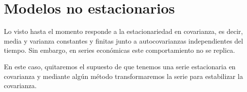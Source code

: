 \documentclass[a4paper,10pt]{article}
\begin{document}
\begin{comment}
      - **Media Móvil Exponencial:** Es un tipo particular de Media Móvil Ponderada que responde a un crecimiento o decrecimiento exponencial, donde los datos antiguos influyen, pero es casi insignificante.

<br>
<br>
<br>
Luego de esta introducción podemos definir matemáticamente a los modelos ARMA. El modelo general de series temporales autorregresivo con media móvil de _p_ términos autorregresivos y _q_ términos de media móvil se expresa como:
<p align="center">
  <img src=https://economipedia.com/wp-content/uploads/Modelo-ARMA.jpg />
</p>
\end{comment}


\section{Modelos no estacionarios}

Lo visto hasta el momento responde a la estacionariedad en covarianza, es decir, media y varianza constantes y finitas junto a autocovarianzas independientes del tiempo. Sin embargo, en series económicas este comportamiento no se replica.

En este caso, quitaremos el supuesto de que tenemos una serie estacionaria en covarianza y mediante algún método transformaremos la serie para estabilizar la covarianza.

\begin{comment}
\subsection{Transformación de la varianza}

Suponemos que la varianza del proceso la podemos expresar mediante una función:

\begin{equation}
V(Y_t) = k f(\mu_t)
\end{equation}

donde $k$ es una constante positiva y $f$ una función conocida. Por otro lado, buscaremos una función $h$ que transforme la serie de tal forma que $h(Y_t)$ tenga varianza constante.

Desarrollaremos la serie de Taylor de primer orden alrededor de $\mu_t$:

\begin{equation}
h(Y_t) \approx h(\mu_t) + (Y_t - \mu_t) h'(\mu_t)
\end{equation}

La varianza de la transformación es aproximable según:

\begin{equation}
V[h(Y_t)] \approx V[h(\mu_t) + (Y_t - \mu_t)h'(\mu_t)] = V(Y_t) [h'(\mu_t)]^2  = k f(\mu_t) [h'(\mu_t)]^2
\end{equation}

Por lo tanto, para que la varianza de la transformación sea constante, debe cumplirse que:

\begin{equation}
h'(\mu_t) = \frac{1}{\sqrt{f(\mu_t)}}
\end{equation}

CONTINUAR
\end{comment}
\end{document}
